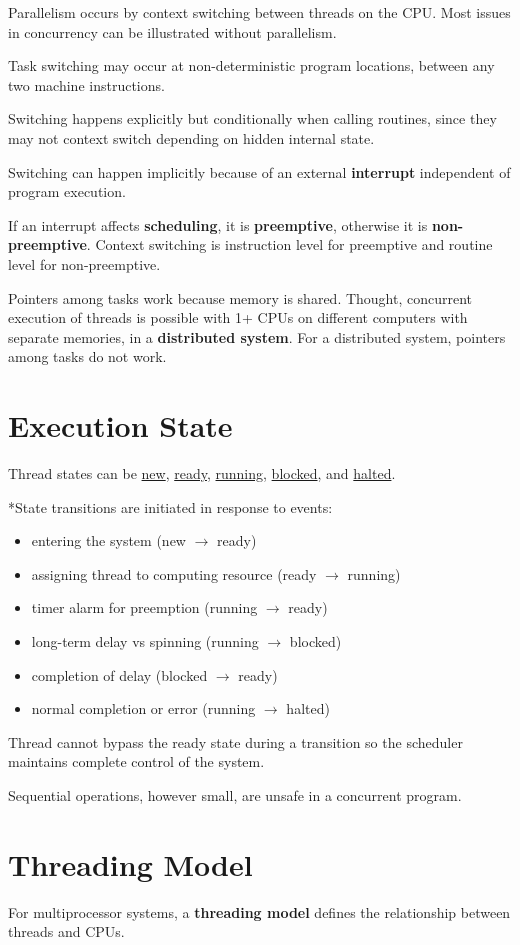 \documentclass[11pt]{article}
\begin{document}
Parallelism occurs by context switching between threads on the CPU.
Most issues in concurrency can be illustrated without parallelism.

Task switching may occur at non-deterministic program locations, between any two machine instructions.

Switching happens explicitly but conditionally when calling routines, since they may not context
switch depending on hidden internal state.

Switching can happen implicitly because of an external \textbf{interrupt} independent of program execution.

If an interrupt affects \textbf{scheduling}, it is \textbf{preemptive}, otherwise it is \textbf{non-preemptive}.
Context switching is instruction level for preemptive and routine level for non-preemptive.

Pointers among tasks work because memory is shared.
Thought, concurrent execution of threads is possible with 1+ CPUs on different computers with separate
memories, in a \textbf{distributed system}. For a distributed system, pointers among tasks do not work.
\section{Execution State}
\label{sec:org3981a10}
Thread states can be \uline{new}, \uline{ready}, \uline{running}, \uline{blocked}, and \uline{halted}.

*State transitions are initiated in response to events:
\begin{itemize}
\item entering the system (new \(\to\) ready)
\item assigning thread to computing resource (ready \(\to\) running)
\item timer alarm for preemption (running \(\to\) ready)
\item long-term delay vs spinning (running \(\to\) blocked)
\item completion of delay (blocked \(\to\) ready)
\item normal completion or error (running \(\to\) halted)
\end{itemize}

Thread cannot bypass the ready state during a transition so the scheduler maintains complete control
of the system.

Sequential operations, however small, are unsafe in a concurrent program.
\section{Threading Model}
\label{sec:org35916a9}
For multiprocessor systems, a \textbf{threading model} defines the relationship between threads and CPUs.
\end{document}
